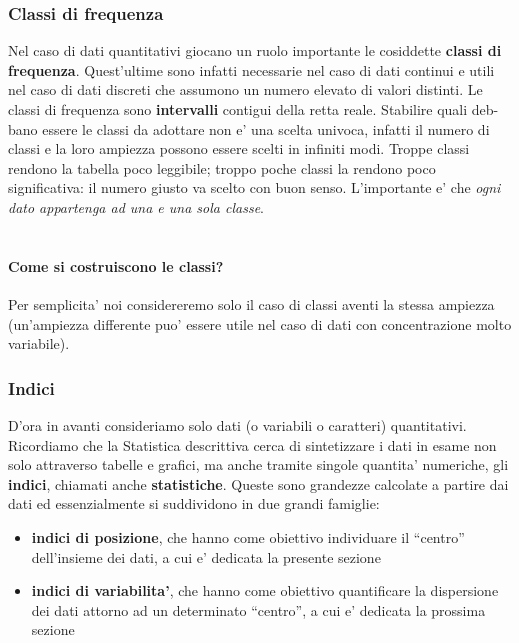 \documentclass[a4paper,12pt]{article}
\begin{document}
\subsubsection{Classi di frequenza}
Nel caso di dati quantitativi giocano un ruolo importante le cosiddette \textbf{classi di frequenza}. Quest’ultime sono infatti necessarie nel caso di dati continui e utili nel caso di
dati discreti che assumono un numero elevato di valori distinti.
Le classi di frequenza sono \textbf{intervalli} contigui della retta reale. Stabilire quali deb-
bano essere le classi da adottare non e' una scelta univoca, infatti il numero di classi e la
loro ampiezza possono essere scelti in infiniti modi. Troppe classi rendono la tabella poco
leggibile; troppo poche classi la rendono poco significativa: il numero giusto va scelto con
buon senso. L’importante e' che \textit{ogni dato appartenga ad una e una sola classe}.\\
\vspace{1em}\\
\paragraph{Come si costruiscono le classi?} Per semplicita' noi considereremo solo il caso di classi
aventi la stessa ampiezza (un’ampiezza differente puo' essere utile nel caso di dati con
concentrazione molto variabile).
\subsubsection{Indici}
D’ora in avanti consideriamo solo dati (o variabili o caratteri) quantitativi. Ricordiamo che la Statistica descrittiva cerca di sintetizzare i dati in esame non solo attraverso
tabelle e grafici, ma anche tramite singole quantita' numeriche, gli \textbf{indici}, chiamati anche \textbf{statistiche}. Queste sono grandezze calcolate a partire dai dati ed essenzialmente si
suddividono in due grandi famiglie:
\begin{itemize}
  \item \textbf{indici di posizione}, che hanno come obiettivo individuare il “centro” dell’insieme dei dati, a cui e' dedicata la presente sezione
  \item \textbf{indici di variabilita'}, che hanno come obiettivo quantificare la dispersione dei dati attorno ad un determinato “centro”, a cui e' dedicata la prossima sezione
\end{itemize}
\vspace{1em}
\\
\vspace{1px}\\
\end{document}
